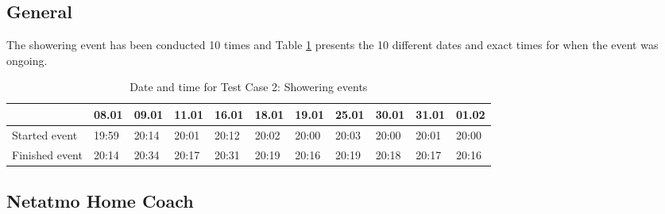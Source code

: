 \subsection{General}
The showering event has been conducted 10 times and Table \ref{tab:ShoweringDates} presents the 10 different dates and exact times for when the event was ongoing.
\begin{table}[!hbtp]
    \centering
    \caption{Date and time for Test Case 2: Showering events}
    \begin{adjustbox}{width=1\textwidth} 
        \begin{tabular}{l|l|l|l|l|l|l|l|l|l|l|}
            \cline{2-11}
                & 08.01 & 09.01 & 11.01 & 16.01 & 18.01 & 19.01 & 25.01 & 30.01 & 31.01 & 01.02 \\ \hline
            \multicolumn{1}{|l|}{Started event}  & 19:59 & 20:14 & 20:01 & 20:12 & 20:02 & 20:00 & 20:03 & 20:00 & 20:01 & 20:00 \\ \hline
            \multicolumn{1}{|l|}{Finished event} & 20:14 & 20:34 & 20:17 & 20:31 & 20:19 & 20:16 & 20:19 & 20:18 & 20:17 & 20:16 \\ \hline
        \end{tabular}
    \end{adjustbox}
    \label{tab:ShoweringDates}
\end{table}

\subsection{Netatmo Home Coach}

